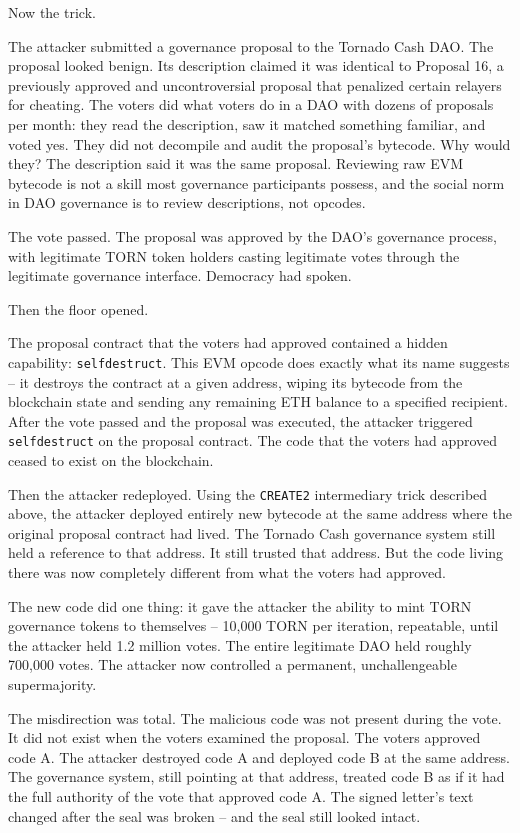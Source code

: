 \documentclass[
  11pt,
  openany]{report}
\begin{document}
Now the trick.

The attacker submitted a governance proposal to the Tornado Cash DAO. The
proposal looked benign. Its description claimed it was identical to Proposal 16,
a previously approved and uncontroversial proposal that penalized certain
relayers for cheating. The voters did what voters do in a DAO with dozens of
proposals per month: they read the description, saw it matched something
familiar, and voted yes. They did not decompile and audit the proposal's
bytecode. Why would they? The description said it was the same proposal.
Reviewing raw EVM bytecode is not a skill most governance participants possess,
and the social norm in DAO governance is to review descriptions, not opcodes.

The vote passed. The proposal was approved by the DAO's governance process, with
legitimate TORN token holders casting legitimate votes through the legitimate
governance interface. Democracy had spoken.

Then the floor opened.

The proposal contract that the voters had approved contained a hidden
capability: \texttt{selfdestruct}. This EVM opcode does exactly what its name
suggests -- it destroys the contract at a given address, wiping its bytecode
from the blockchain state and sending any remaining ETH balance to a specified
recipient. After the vote passed and the proposal was executed, the attacker
triggered \texttt{selfdestruct} on the proposal contract. The code that the
voters had approved ceased to exist on the blockchain.

Then the attacker redeployed. Using the \texttt{CREATE2} intermediary trick
described above, the attacker deployed entirely new bytecode at the same address
where the original proposal contract had lived. The Tornado Cash governance
system still held a reference to that address. It still trusted that address.
But the code living there was now completely different from what the voters had
approved.

The new code did one thing: it gave the attacker the ability to mint TORN
governance tokens to themselves -- 10,000 TORN per iteration, repeatable, until
the attacker held 1.2 million votes. The entire legitimate DAO held roughly
700,000 votes. The attacker now controlled a permanent, unchallengeable
supermajority.

The misdirection was total. The malicious code was not present during the vote.
It did not exist when the voters examined the proposal. The voters approved code
A. The attacker destroyed code A and deployed code B at the same address. The
governance system, still pointing at that address, treated code B as if it had
the full authority of the vote that approved code A. The signed letter's text
changed after the seal was broken -- and the seal still looked intact.
\end{document}
